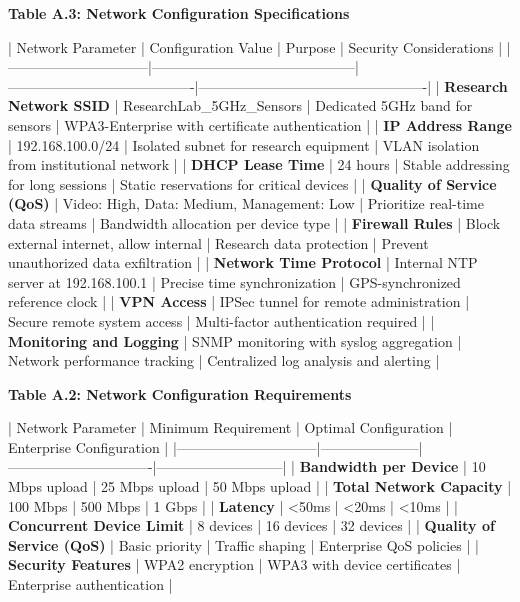 \documentclass[12pt,a4paper]{article}
\begin{document}
\textbf{Table A.3: Network Configuration Specifications}

| Network Parameter            | Configuration Value                        | Purpose                                | Security Considerations                         |
|------------------------------|--------------------------------------------|----------------------------------------|-------------------------------------------------|
| \textbf{Research Network SSID}    | ResearchLab\_5GHz\_Sensors                   | Dedicated 5GHz band for sensors        | WPA3-Enterprise with certificate authentication |
| \textbf{IP Address Range}         | 192.168.100.0/24                           | Isolated subnet for research equipment | VLAN isolation from institutional network       |
| \textbf{DHCP Lease Time}          | 24 hours                                   | Stable addressing for long sessions    | Static reservations for critical devices        |
| \textbf{Quality of Service (QoS)} | Video: High, Data: Medium, Management: Low | Prioritize real-time data streams      | Bandwidth allocation per device type            |
| \textbf{Firewall Rules}           | Block external internet, allow internal    | Research data protection               | Prevent unauthorized data exfiltration          |
| \textbf{Network Time Protocol}    | Internal NTP server at 192.168.100.1       | Precise time synchronization           | GPS-synchronized reference clock                |
| \textbf{VPN Access}               | IPSec tunnel for remote administration     | Secure remote system access            | Multi-factor authentication required            |
| \textbf{Monitoring and Logging}   | SNMP monitoring with syslog aggregation    | Network performance tracking           | Centralized log analysis and alerting           |

\textbf{Table A.2: Network Configuration Requirements}

| Network Parameter            | Minimum Requirement | Optimal Configuration         | Enterprise Configuration  |
|------------------------------|---------------------|-------------------------------|---------------------------|
| \textbf{Bandwidth per Device}     | 10 Mbps upload      | 25 Mbps upload                | 50 Mbps upload            |
| \textbf{Total Network Capacity}   | 100 Mbps            | 500 Mbps                      | 1 Gbps                    |
| \textbf{Latency}                  | <50ms               | <20ms                         | <10ms                     |
| \textbf{Concurrent Device Limit}  | 8 devices           | 16 devices                    | 32 devices                |
| \textbf{Quality of Service (QoS)} | Basic priority      | Traffic shaping               | Enterprise QoS policies   |
| \textbf{Security Features}        | WPA2 encryption     | WPA3 with device certificates | Enterprise authentication |
\end{document}

